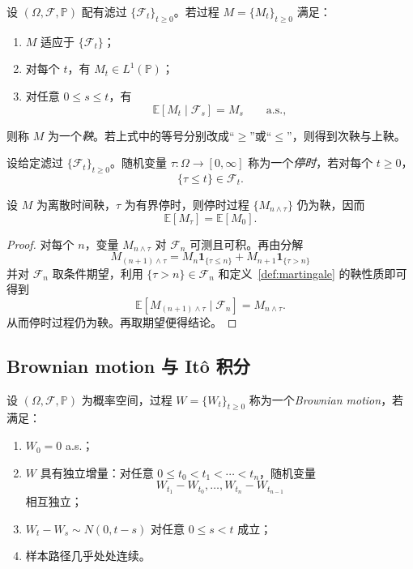 \begin{definition}[鞅]\label{def:martingale}
设 $(\Omega,\mathscr F,\mathbb P)$ 配有滤过 $\{\mathscr F_t\}_{t\ge0}$。若过程 $M=\{M_t\}_{t\ge0}$ 满足：
\begin{enumerate}
  \item $M$ 适应于 $\{\mathscr F_t\}$；
  \item 对每个 $t$，有 $M_t\in L^1(\mathbb P)$；
  \item 对任意 $0\le s\le t$，有
  \[
  \mathbb E[M_t\mid \mathscr F_s]=M_s \qquad \text{a.s.},
  \]
\end{enumerate}
则称 $M$ 为一个\emph{鞅}。若上式中的等号分别改成“$\ge$”或“$\le$”，则得到次鞅与上鞅。
\end{definition}

\begin{definition}[停时]
设给定滤过 $\{\mathscr F_t\}_{t\ge0}$。随机变量 $\tau\colon \Omega\to [0,\infty]$ 称为一个\emph{停时}，若对每个 $t\ge0$，
\[
\{\tau\le t\}\in \mathscr F_t.
\]
\end{definition}

\begin{proposition}[停时与鞅的基本前瞻]\label{prop:optional-sampling-preview}
设 $M$ 为离散时间鞅，$\tau$ 为有界停时，则停时过程 $\{M_{n\wedge \tau}\}$ 仍为鞅，因而
\[
\mathbb E[M_\tau]=\mathbb E[M_0].
\]
\end{proposition}

\begin{proof}
对每个 $n$，变量 $M_{n\wedge \tau}$ 对 $\mathscr F_n$ 可测且可积。再由分解
\[
M_{(n+1)\wedge \tau}=M_n\mathbf 1_{\{\tau\le n\}}+M_{n+1}\mathbf 1_{\{\tau>n\}}
\]
并对 $\mathscr F_n$ 取条件期望，利用 $\{\tau>n\}\in \mathscr F_n$ 和定义~\ref{def:martingale} 的鞅性质即可得到
\[
\mathbb E[M_{(n+1)\wedge \tau}\mid \mathscr F_n]=M_{n\wedge \tau}.
\]
从而停时过程仍为鞅。再取期望便得结论。
\end{proof}

\subsection{Brownian motion 与 Itô 积分}

\begin{definition}\label{def:brownian-motion}
设 $(\Omega,\mathscr F,\mathbb P)$ 为概率空间，过程 $W=\{W_t\}_{t\ge0}$ 称为一个\emph{Brownian motion}，若满足：
\begin{enumerate}
  \item $W_0=0$ a.s.；
  \item $W$ 具有独立增量：对任意 $0\le t_0<t_1<\cdots<t_n$，随机变量
  \[
  W_{t_1}-W_{t_0},\dots,W_{t_n}-W_{t_{n-1}}
  \]
  相互独立；
  \item $W_t-W_s\sim N(0,t-s)$ 对任意 $0\le s<t$ 成立；
  \item 样本路径几乎处处连续。
\end{enumerate}
\end{definition}

